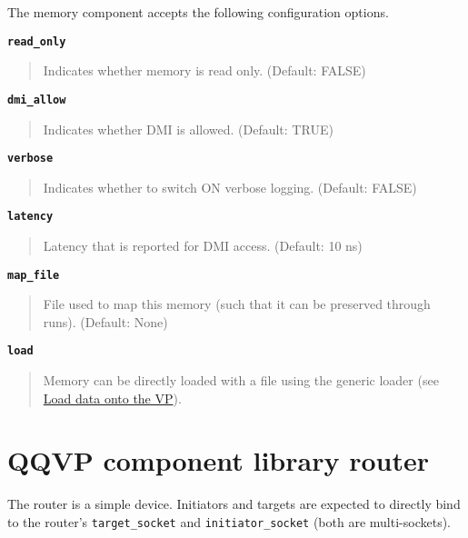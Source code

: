 The memory component accepts the following configuration options.

{\textbf {\footnotesize{\lstinline!read_only!}}}
\vspace{-2pt}
\begin{quote}
Indicates whether memory is read only. (Default: FALSE)
\end{quote}


{\textbf {\footnotesize{\lstinline!dmi_allow!}}}
\vspace{-2pt}
\begin{quote}
Indicates whether DMI is allowed. (Default: TRUE)
\end{quote}


{\textbf {\footnotesize{\lstinline!verbose!}}}
\vspace{-2pt}
\begin{quote}
Indicates whether to switch ON verbose logging. (Default: FALSE)
\end{quote}


{\textbf {\footnotesize{\lstinline!latency!}}}
\vspace{-2pt}
\begin{quote}
Latency that is reported for DMI access. (Default: 10 ns)
\end{quote}


{\textbf {\footnotesize{\lstinline!map_file!}}}
\vspace{-2pt}
\begin{quote}
File used to map this memory (such that it can be preserved through runs). (Default: None)
\end{quote}


{\textbf {\footnotesize{\lstinline!load!}}}
\vspace{-2pt}
\begin{quote}
Memory can be directly loaded with a file using the generic loader (see \hyperref[sec:load-data-on-vp]{Load data onto the VP}).
\end{quote}


\section{QQVP component library router}

The router is a simple device. Initiators and targets are expected to directly bind to the router's {\small{\lstinline!target_socket!}} and {\small{\lstinline!initiator_socket!}} (both are multi-sockets).

